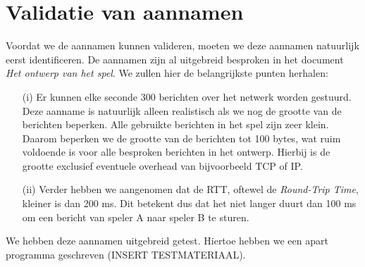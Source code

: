 \section{Validatie van aannamen}
Voordat we de aannamen kunnen valideren, moeten we deze aannamen natuurlijk eerst identificeren. De aannamen zijn al uitgebreid besproken in het document \emph{Het ontwerp van het spel}. We zullen hier de belangrijkste punten herhalen:
\begin{enumerate}
\item[(i)] Er kunnen elke seconde 300 berichten over het netwerk worden gestuurd. Deze aanname is natuurlijk alleen realistisch als we nog de grootte van de berichten beperken. Alle gebruikte berichten in het spel zijn zeer klein. Daarom beperken we de grootte van de berichten tot 100 bytes, wat ruim voldoende is voor alle besproken berichten in het ontwerp. Hierbij is de grootte exclusief eventuele overhead van bijvoorbeeld TCP of IP.
\item[(ii)] Verder hebben we aangenomen dat de RTT, oftewel de \emph{Round-Trip Time}, kleiner is dan 200 ms. Dit betekent dus dat het niet langer duurt dan 100 ms om een bericht van speler A naar speler B te sturen.
\end{enumerate}

We hebben deze aannamen uitgebreid getest. Hiertoe hebben we een apart programma geschreven (INSERT TESTMATERIAAL).
